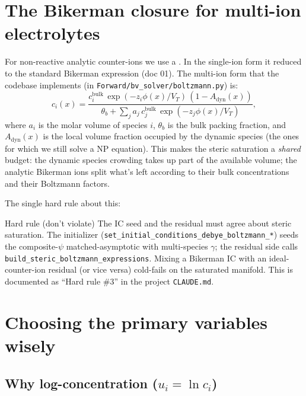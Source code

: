 \documentclass[11pt]{article}
\begin{document}
\section{The Bikerman closure for multi-ion electrolytes}

For non-reactive analytic counter-ions we use a
. In the
single-ion form it reduced to the standard Bikerman expression (doc 01). The multi-ion form
that the codebase implements (in
\texttt{Forward/bv\_solver/boltzmann.py}) is:
\begin{equation}
  c_i(x) = \frac{c_i^{\mathrm{bulk}}\,\exp(-z_i \phi(x)/V_T)\,(1 - A_{\mathrm{dyn}}(x))}
                {\theta_b + \sum_j a_j\, c_j^{\mathrm{bulk}}\,\exp(-z_j \phi(x)/V_T)},
  \label{eq:multi-bikerman}
\end{equation}
where $a_i$ is the molar volume of species $i$, $\theta_b$ is the
bulk packing fraction, and $A_{\mathrm{dyn}}(x)$ is the local
volume fraction occupied by the dynamic species (the ones for which
we still solve a NP equation). This makes the steric saturation a
\emph{shared} budget: the dynamic species crowding takes up part of
the available volume; the analytic Bikerman ions split what's left
according to their bulk concentrations and their Boltzmann factors.

The single hard rule about this:
\begin{callout}{Hard rule (don't violate)}
The IC seed and the residual must agree about steric saturation.
The initializer (\texttt{set\_initial\_conditions\_debye\_boltzmann\_*})
seeds the composite-$\psi$ matched-asymptotic with multi-species
$\gamma$; the residual side calls
\texttt{build\_steric\_boltzmann\_expressions}. Mixing a Bikerman IC
with an ideal-counter-ion residual (or vice versa) cold-fails on
the saturated manifold. This is documented as ``Hard rule \#3'' in
the project \texttt{CLAUDE.md}.
\end{callout}

\section{Choosing the primary variables wisely}

\subsection{Why log-concentration ($u_i = \ln c_i$)}
\end{document}
